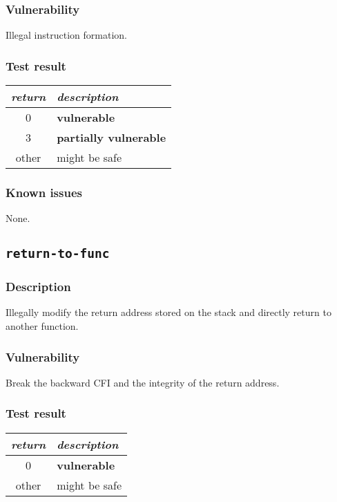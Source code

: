 \documentclass[a4paper]{book}
\begin{document}
\subsubsection{Vulnerability}
Illegal instruction formation.

\subsubsection{Test result}
\begin{tabular}{cl}
  \toprule
  \emph{return}  & \emph{description} \\
  \midrule
  0              & \textbf{vulnerable} \\
  3              & \textbf{partially vulnerable} \\
  other          & might be safe \\
  \bottomrule
\end{tabular}
  
\subsubsection{Known issues}

None.

\newpage
\subsection{\texttt{return-to-func}}\label{test-return-to-func}

\subsubsection{Description}
Illegally modify the return address stored on the stack and directly return to another function.

\subsubsection{Vulnerability}
Break the backward CFI and the integrity of the return address.

\subsubsection{Test result}
\begin{tabular}{cl}
  \toprule
  \emph{return}  & \emph{description} \\
  \midrule
  0              & \textbf{vulnerable} \\
  other          & might be safe \\
  \bottomrule
\end{tabular}
  
\end{document}
